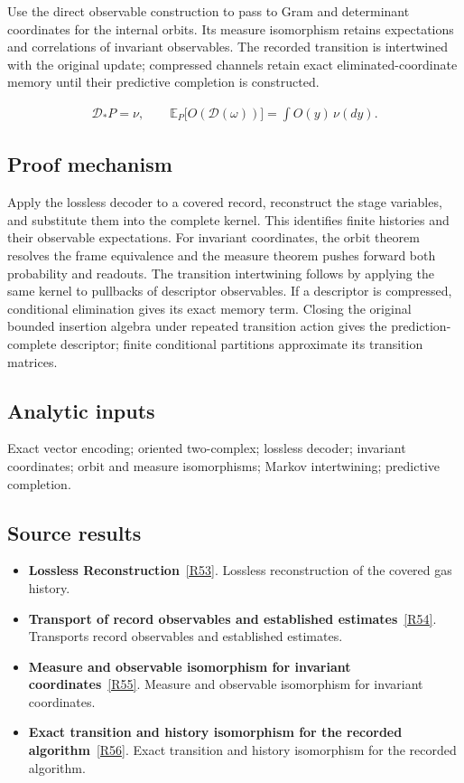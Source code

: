 \documentclass[11pt,a4paper]{article}
\begin{document}
Use the direct observable construction to pass to Gram and determinant coordinates for the internal orbits. Its measure isomorphism retains expectations and correlations of invariant observables. The recorded transition is intertwined with the original update; compressed channels retain exact eliminated-coordinate memory until their predictive completion is constructed.


\begin{gather*}
\mathscr D_*P=\nu,\qquad
\mathbb E_P\bigl[O(\mathscr D(\omega))\bigr]=\int O(y)\,\nu(dy).
\end{gather*}
\subsection*{Proof mechanism}
Apply the lossless decoder to a covered record, reconstruct the stage variables, and substitute them into the complete kernel. This identifies finite histories and their observable expectations. For invariant coordinates, the orbit theorem resolves the frame equivalence and the measure theorem pushes forward both probability and readouts. The transition intertwining follows by applying the same kernel to pullbacks of descriptor observables. If a descriptor is compressed, conditional elimination gives its exact memory term. Closing the original bounded insertion algebra under repeated transition action gives the prediction-complete descriptor; finite conditional partitions approximate its transition matrices.
\subsection*{Analytic inputs}
Exact vector encoding; oriented two-complex; lossless decoder; invariant coordinates; orbit and measure isomorphisms; Markov intertwining; predictive completion.
\subsection*{Source results}
\begin{itemize}
\item \textbf{Lossless Reconstruction}~\hyperref[src:thm-fractal-set-lossless]{[R53]}. Lossless reconstruction of the covered gas history.
\item \textbf{Transport of record observables and established estimates}~\hyperref[src:prop-fractal-set-analytic-transfer]{[R54]}. Transports record observables and established estimates.
\item \textbf{Measure and observable isomorphism for invariant coordinates}~\hyperref[src:thm-sm-direct-measure-isomorphism]{[R55]}. Measure and observable isomorphism for invariant coordinates.
\item \textbf{Exact transition and history isomorphism for the recorded algorithm}~\hyperref[src:thm-sm-instantiated-record-transition]{[R56]}. Exact transition and history isomorphism for the recorded algorithm.
\end{itemize}
\end{document}
